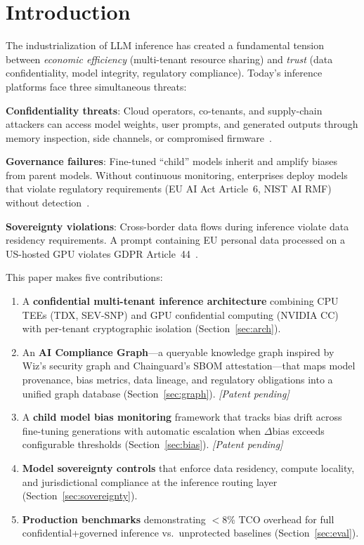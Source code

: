 \documentclass[conference,10pt]{IEEEtran}
\begin{document}
\section{Introduction}
\label{sec:intro}

The industrialization of LLM inference has created a fundamental tension between \emph{economic efficiency} (multi-tenant resource sharing) and \emph{trust} (data confidentiality, model integrity, regulatory compliance). Today's inference platforms face three simultaneous threats:

\textbf{Confidentiality threats}: Cloud operators, co-tenants, and supply-chain attackers can access model weights, user prompts, and generated outputs through memory inspection, side channels, or compromised firmware~\cite{hunt2024confidential}.

\textbf{Governance failures}: Fine-tuned ``child'' models inherit and amplify biases from parent models. Without continuous monitoring, enterprises deploy models that violate regulatory requirements (EU AI Act Article~6, NIST AI RMF) without detection~\cite{sallam2024bias,euaiact2025}.

\textbf{Sovereignty violations}: Cross-border data flows during inference violate data residency requirements. A prompt containing EU personal data processed on a US-hosted GPU violates GDPR Article~44~\cite{jobin2023ai}.

This paper makes five contributions:
\begin{enumerate}
\item A \textbf{confidential multi-tenant inference architecture} combining CPU TEEs (TDX, SEV-SNP) and GPU confidential computing (NVIDIA CC) with per-tenant cryptographic isolation (Section~\ref{sec:arch}).
\item An \textbf{AI Compliance Graph}---a queryable knowledge graph inspired by Wiz's security graph and Chainguard's SBOM attestation---that maps model provenance, bias metrics, data lineage, and regulatory obligations into a unified graph database (Section~\ref{sec:graph}). \emph{[Patent pending]}
\item A \textbf{child model bias monitoring} framework that tracks bias drift across fine-tuning generations with automatic escalation when $\Delta$bias exceeds configurable thresholds (Section~\ref{sec:bias}). \emph{[Patent pending]}
\item \textbf{Model sovereignty controls} that enforce data residency, compute locality, and jurisdictional compliance at the inference routing layer (Section~\ref{sec:sovereignty}).
\item \textbf{Production benchmarks} demonstrating $<$8\% TCO overhead for full confidential+governed inference vs.\ unprotected baselines (Section~\ref{sec:eval}).
\end{enumerate}
\end{document}
